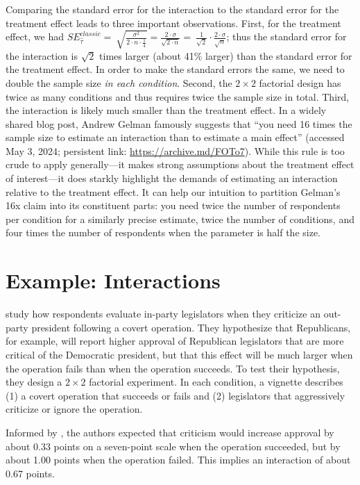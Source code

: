 \documentclass[12pt]{article}
\begin{document}
Comparing the standard error for the interaction to the standard error for the treatment effect leads to three important observations. First, for the treatment effect, we had $SE_{\widehat{\tau}}^{classic} = \ \sqrt{\frac{\sigma^{2}}{2 \cdot n \cdot \frac{1}{4}}} = \frac{2 \cdot \sigma}{\sqrt{2 \cdot n}} = \ \frac{1}{\sqrt{2}} \cdot \frac{2 \cdot \sigma}{\sqrt{n}}$; thus the standard error for the interaction is $\sqrt{2}$ times larger (about 41\% larger) than the standard error for the treatment effect. In order to make the standard errors the same, we need to double the sample size \textit{in each condition}.
Second, the $2 \times 2$ factorial design has twice as many conditions and thus requires twice the sample size in total. 
Third, the interaction is likely much smaller than the treatment effect. 
In a widely shared blog post, Andrew Gelman famously suggests that ``you
need 16 times the sample size to estimate an interaction than to
estimate a main effect'' (accessed May 3, 2024; persistent link:
\url{https://archive.md/FOTo7}). 
While this rule is too crude to apply generally---it makes strong assumptions about the treatment effect of interest---it does starkly highlight the demands of estimating an interaction relative to the treatment effect. 
It can help our intuition to partition Gelman's 16x claim into its constituent parts: you need twice the number of respondents per condition for a similarly precise estimate, twice the number of conditions, and four times the number of respondents when the parameter is half the size.

\section*{Example: Interactions}

\cite{Robbins2024} study how respondents evaluate in-party legislators when they criticize an out-party president following a covert operation. 
They hypothesize that Republicans, for example, will report higher approval of Republican legislators that are more critical of the Democratic president, but that this effect will be much larger when the operation fails than when the operation succeeds. 
To test their hypothesis, they design a $2 \times 2$ factorial experiment. 
In each condition, a vignette describes (1) a covert operation that succeeds or fails and (2) legislators that aggressively criticize or ignore the operation.

Informed by \cite{Myrick2020}, the authors expected that criticism would increase approval by about 0.33 points on a seven-point scale when the operation succeeded, but by about 1.00 points when the operation failed.
This implies an interaction of about 0.67 points.
\end{document}

